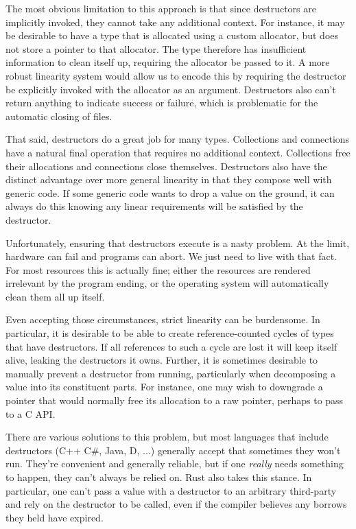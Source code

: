 The most obvious limitation to this approach is that since destructors are implicitly invoked,
they cannot take any additional context. For instance, it may be desirable
to have a type that is allocated using a custom allocator, but does not store
a pointer to that allocator. The type therefore has insufficient information
to clean itself up, requiring the allocator be passed to it. A more robust linearity
system would allow us to encode this by requiring the destructor be explicitly invoked with
the allocator as an argument. Destructors also can't return anything to indicate
success or failure, which is problematic for the automatic closing of files.

That said, destructors do a great job for many types. Collections and connections
have a natural final operation that requires no additional context.
Collections free their allocations and connections close themselves.
Destructors also have the distinct advantage over more general linearity in that
they compose well with generic code. If some generic code wants to drop a value
on the ground, it can always do this knowing any linear requirements will be
satisfied by the destructor.

Unfortunately, ensuring that destructors execute is a nasty problem.
At the limit, hardware can fail and programs can abort. We just need to live
with that fact. For most resources this is actually fine; either the resources are
rendered irrelevant by the program ending, or the operating system will automatically
clean them all up itself.

Even accepting those circumstances, strict
linearity can be burdensome. In particular, it is desirable to be able to
create reference-counted cycles of types that have destructors. If all references to
such a cycle are lost it will keep itself alive, leaking the destructors it
owns. Further, it is sometimes desirable to manually prevent a destructor
from running, particularly when decomposing a value into its constituent parts. For
instance, one may wish to downgrade a pointer that would normally free its allocation
to a raw pointer, perhaps to pass to a C API.

There are various solutions to this problem, but most languages that include
destructors (C++ C\#, Java, D, ...) generally accept that sometimes
they won't run. They're convenient and generally
reliable, but if one \emph{really} needs something to happen, they can't always be
relied on. Rust also takes this stance. In particular, one can't pass a value with
a destructor to an arbitrary third-party and rely on the destructor to be called,
even if the compiler believes any borrows they held have expired.

